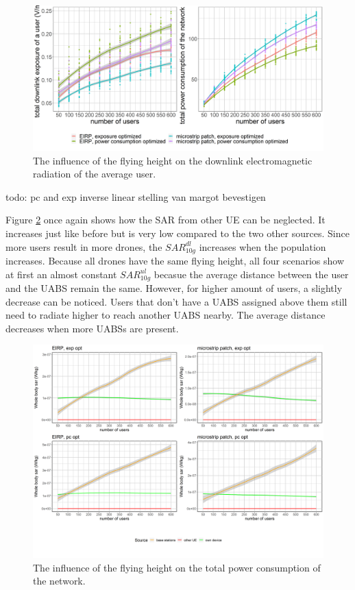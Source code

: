 \begin{figure}[h!]
  \includegraphics[width=\textwidth]{../results/s3/uvsdlAndPc.png}
  \caption{The influence of the flying height on the downlink electromagnetic radiation of the average user.}
  \label{fig:s3b_dlAndPC}
\end{figure}


todo: pc and exp inverse linear stelling van margot bevestigen

Figure \ref{fig:s3fhvspc} once again shows how the \gls{SAR} from other \gls{UE} can be neglected. It increases just like before but is very 
low compared to the two other sources. Since more users result in more drones, the $SAR^{dl}_{10g}$ increases when the population 
increases. Because all drones have the same flying height, all four scenarios show at first an almost constant $SAR^{ul}_{10g}$ becasue the average 
distance between the user and the \gls{UABS} remain the same. However, for higher amount of users, a slightly decrease can be noticed.
Users that don't have a \gls{UABS} assigned above them still need to radiate higher to reach another \gls{UABS} nearby. The average distance 
decreases when more \gls{UABS}s are present.

\begin{figure}[h!]
  \includegraphics[width=\textwidth]{../results/s3/uFourSources.png}
  \caption{The influence of the flying height on the total power consumption of the network.}
  \label{fig:s3fhvspc}
\end{figure}
